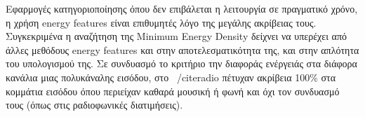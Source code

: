 
Εφαρμογές κατηγοριοποίησης όπου δεν επιβάλεται η λειτουργία σε
πραγματικό χρόνο, η χρήση energy features είναι επιθυμητές λόγο της
μεγάλης ακρίβειας τους. Συγκεκριμένα η αναζήτηση της Minimum Energy
Density δείχνει να υπερέχει από άλλες μεθόδους energy features και
στην αποτελεσματικότητα της, και στην απλότητα του υπολογισμού της. Σε
συνδυασμό το κριτήριο την διαφοράς ενέργειάς στα διάφορα κανάλια μιας
πολυκάναλης εισόδου, στο ~/cite{radio} πέτυχαν ακρίβεια 100\% στα
κομμάτια εισόδου όπου περιείχαν καθαρά μουσική ή φωνή και όχι τον
συνδυασμό τους (όπως στις ραδιοφωνικές διατιμήσεις).

